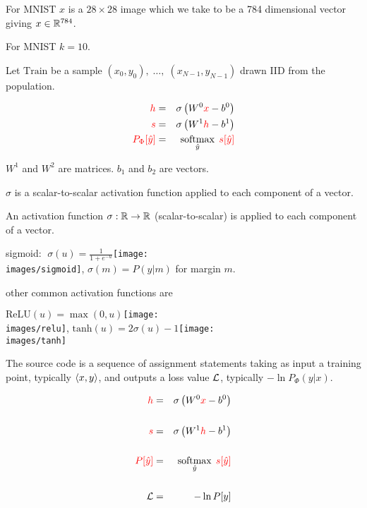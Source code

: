 {\vfill
For MNIST $x$ is a $28 \times 28$ image which we take to be a 784 dimensional vector giving $x \in \mathbb{R}^{784}$.

\vfill
For MNIST $k = 10$.

\vfill
Let $\mathrm{Train}$ be a sample $(x_0,y_0),\;\ldots,\;(x_{N-1},y_{N-1})$ drawn IID from the population.

\begin{eqnarray*}
  {\color{red} h} & = & \sigma\left(W^0{\color{red} x} - b^0\right) \\
  {\color{red} s} & = & \sigma\left(W^1{\color{red} h} - b^1 \right) \\
  {\color{red} P_\Phi[\hat{y}]} & = & \operatorname*{softmax}_{\hat{y}}\;{\color{red} s[\hat{y}]}
\end{eqnarray*}

\vfill
$W^1$ and $W^2$ are matrices. $b_1$ and $b_2$ are vectors.

\vfill
$\sigma$ is a scalar-to-scalar activation function applied to each component of a vector.


An activation function $\sigma:\mathbb{R} \rightarrow \mathbb{R}$ (scalar-to-scalar) is applied to each component of a vector.

\vfill
\centerline{{\color{red} sigmoid: $\;\sigma(u) = \frac{1}{1+e^{-u}}$}\hspace{1em}\texttt{[image: \\images/sigmoid]}, {\color{red} $\sigma(m) = P(y|m)$ for margin $m$}.}

\vfill
other common activation functions are

\vfill
\centerline{{\color{red} $\mathrm{ReLU}(u) = \max(0,u)$}\texttt{[image: \\images/relu]},
{\color{red} $\mathrm{tanh}(u) = 2\sigma(u)-1$}\texttt{[image: \\images/tanh]}}


The source code is a sequence of assignment statements taking as input a training point, typically ${\mbox{$\langle x,y\rangle$}}$,
and outputs a loss value ${\cal L}$, typically $-\ln P_\Phi(y|x)$.

\begin{eqnarray*}
  {\color{red} h} & = & \sigma\left(W^0{\color{red} x} - b^0\right) \\
  \\
  {\color{red} s} & = & \sigma\left(W^1{\color{red} h} - b^1 \right) \\
  \\
  {\color{red} P[\hat{y}]} & = & \operatorname*{softmax}_{\hat{y}}\;{\color{red} s[\hat{y}]} \\
  \\
  {\cal L} & = & - \ln P[y]
\end{eqnarray*}

}
